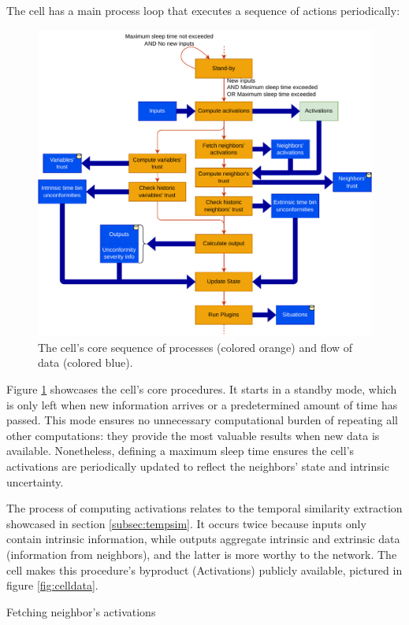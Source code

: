 The cell has a main process loop that executes a sequence of actions periodically: 

\begin{figure}[h!]
    \centering
    \includegraphics[width=12cm]{figures/chapter4/cell/processes.pdf}
    \caption{The cell's core sequence of processes (colored orange) and flow of data (colored blue).}
    \label{fig:cellprocesses}
\end{figure}

Figure \ref{fig:cellprocesses} showcases the cell's core procedures. It starts in a standby mode, which is only left when new information arrives or a predetermined amount of time has passed. This mode ensures no unnecessary computational burden of repeating all other computations: they provide the most valuable results when new data is available. Nonetheless, defining a maximum sleep time ensures the cell's activations are periodically updated to reflect the neighbors' state and intrinsic uncertainty.

The process of computing activations relates to the temporal similarity extraction showcased in section \ref{subsec:tempsim}. It occurs twice because inputs only contain intrinsic information, while outputs aggregate intrinsic and extrinsic data (information from neighbors), and the latter is more worthy to the network. The cell makes this procedure's byproduct (Activations) publicly available, pictured in figure \ref{fig:celldata}.

Fetching neighbor's activations 

